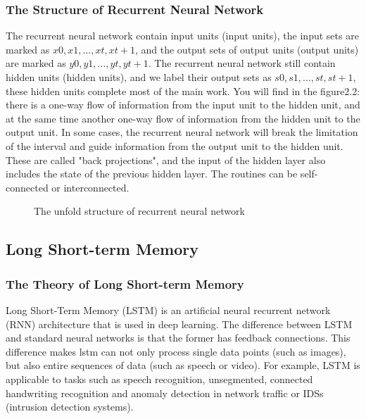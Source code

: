 \subsubsection{The Structure of Recurrent Neural Network}
The recurrent neural network contain input units (input units), the input sets are marked as $x0, x1,..., xt, xt + 1$, and the output sets of output units (output units) are marked as $y0, y1,..., yt, yt + 1$. The recurrent neural network still contain hidden units (hidden units), and we label their output sets as $s0, s1,...,st,st+1$, these hidden units complete most of the main work. You will find in the figure2.2: there is a one-way flow of information from the input unit to the hidden unit, and at the same time another one-way flow of information from the hidden unit to the output unit. In some cases, the recurrent neural network will break the limitation of the interval and guide information from the output unit to the hidden unit. These are called "back projections", and the input of the hidden layer also includes the state of the previous hidden layer. The routines can be self-connected or interconnected.
\begin{figure}[H]
\centering  %
\caption{The unfold structure of recurrent neural network}
\label{The structure of recurrent neural network}
\end{figure}
\subsection{Long Short-term Memory}
\subsubsection{The Theory of Long Short-term Memory}
Long Short-Term Memory (LSTM) is an artificial neural recurrent network (RNN) architecture that is used in deep learning. \cite{hochreiter9ja1} The difference between LSTM and standard neural networks is that the former has feedback connections. This difference makes lstm can not only process single data points (such as images), but also entire sequences of data (such as speech or video). For example, LSTM is applicable to tasks such as speech recognition, unsegmented, connected handwriting recognition and anomaly detection in network traffic or IDSs (intrusion detection systems).\cite{graves2008novel}
